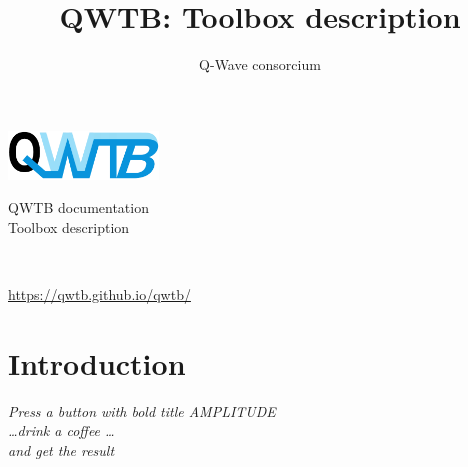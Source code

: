 \documentclass[12pt,a4paper,oneside]{report} %
\begin{document}
\renewcommand\floatpagefraction{.9} \renewcommand\topfraction{.9} \renewcommand\bottomfraction{.9} \renewcommand\textfraction{.1} \setcounter{totalnumber}{50} \setcounter{topnumber}{50} \setcounter{bottomnumber}{50} %
\renewcommand{\labelitemi}{--}          %
\setlength{\unitlength}{1mm}            %

\newenvironment{tightdesc}{\begin{description}[itemsep=0pt]} 
                              {\end{description}}

\def\infosection{Description}
\def\examplesection{Example}
\renewcommand{\chaptername}{}

\title{QWTB: Toolbox description}
\author{Q-Wave consorcium}

\thispagestyle{empty}
\begin{center}
        \vspace*{10em}
        {\huge
        \includegraphics[width=0.3\textwidth]{logo/qwtb_logo.pdf}

        \vspace{2.0em}
        QWTB documentation\\

        \vspace{1.5em}
        Toolbox description}\\

        \vfill
        {\Large \color{red}{QWTB version 0.2}}

        \vspace{1em}
        {\Large \url{https://qwtb.github.io/qwtb/}}
\end{center}
\newpage

\tableofcontents

\chapter{Introduction} %
\bigskip
\begin{center}
        \parbox{0.7\textwidth}{\textit{Press a button with bold title AMPLITUDE\\
        \dots drink a coffee \dots\\
        and get the result}}
\end{center}
\end{document}
